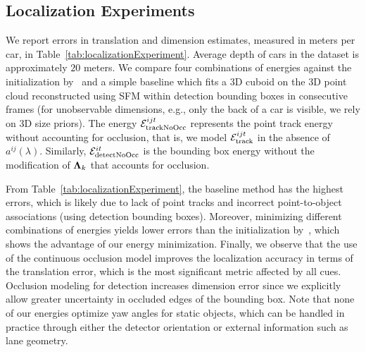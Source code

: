 \subsection{Localization Experiments}
We report errors in translation and dimension estimates, measured in meters per car, in Table~\ref{tab:localizationExperiment}. Average depth of cars in the dataset is approximately $20$ meters. We compare four combinations of energies against the initialization by~\cite{Song_Chandraker_2014} and a simple baseline which fits a 3D cuboid on the 3D point cloud reconstructed using SFM within detection bounding boxes in consecutive frames (for unobservable dimensions, e.g., only the back of a car is visible, we rely on 3D size priors). The energy $\mathcal{E}^{ijt}_{\text{trackNoOcc}}$ represents the point track energy without accounting for occlusion, that is, we model $\mathcal{E}^{ijt}_{\text{track}}$ in the absence of $a^{ij} (\lambda)$. Similarly, $\mathcal{E}^{it}_{\text{detectNoOcc}}$ is the bounding box energy without the modification of $\bm{\Lambda}_k$ that accounts for occlusion.

From Table~\ref{tab:localizationExperiment}, the baseline method has the highest errors, which is likely due to lack of point tracks and incorrect point-to-object associations (using detection bounding boxes). Moreover, minimizing different combinations of energies yields lower errors than the initialization by~\cite{Song_Chandraker_2014}, which shows the advantage of our energy minimization. Finally, we observe that the use of the continuous occlusion model improves the localization accuracy in terms of the translation error, which is the most significant metric affected by all cues. Occlusion modeling for detection increases dimension error since we explicitly allow greater uncertainty in occluded edges of the bounding box. Note that none of our energies optimize yaw angles for static objects, which can be handled in practice through either the detector orientation or external information such as lane geometry.


